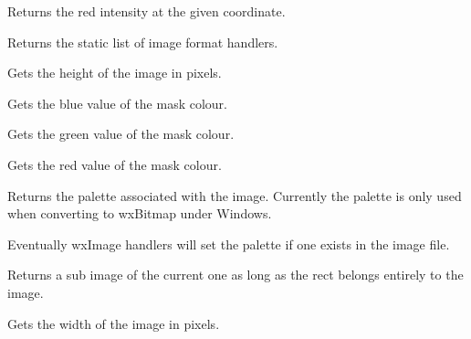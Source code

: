 Returns the red intensity at the given coordinate.



Returns the static list of image format handlers.



\label{wximagegetheight}


Gets the height of the image in pixels.

\label{wximagegetmaskblue}


Gets the blue value of the mask colour.

\label{wximagegetmaskgreen}


Gets the green value of the mask colour.

\label{wximagegetmaskred}


Gets the red value of the mask colour.

\label{wximagegetpalette}


Returns the palette associated with the image. Currently the palette is only
used when converting to wxBitmap under Windows.

Eventually wxImage handlers will set the palette if one exists in the image file.

\label{wximagegetsubimage}


Returns a sub image of the current one as long as the rect belongs entirely to 
the image.

\label{wximagegetwidth}


Gets the width of the image in pixels.

